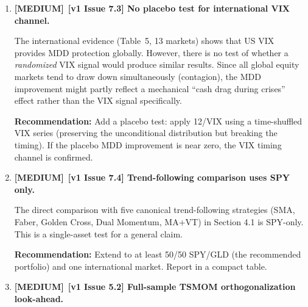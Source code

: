 \documentclass[12pt,a4paper]{article}
\newcommand{\MEDIUM}{\textcolor{medsev}{\textbf{[MEDIUM]}}}
\begin{document}
\begin{enumerate}[label=\textbf{B.\arabic*}]
The paper has 22 assets in Table~1 but the MDD retention decomposition (Table~3 + Table~6 bootstrap) covers only SPY, 50/50, DIA, QQQ, and IWM --- all US large-cap equity (plus a blend). The 90--97\% retention claim is prominently featured in the abstract and conclusion.

\textbf{Severity remains HIGH:} The paper's strongest claim (``90--97\% MDD retention'') rests on 5 assets that are highly correlated (SPY/DIA/QQQ/IWM all have $\rho > 0.85$ with each other). This is essentially 1--2 independent observations. If MDD retention is 70\% for EEM or 50\% for GLD, the narrative changes substantially.

\textbf{Recommendation:} Report MDD retention for all 22 assets (at minimum: one commodity, one bond, one EM equity). If retention varies across asset classes, this is a valuable finding that strengthens the paper (boundary condition), not a weakness.


\item \MEDIUM\ \textbf{[v1 Issue 7.3] No placebo test for international VIX channel.}

The international evidence (Table~5, 13 markets) shows that US VIX provides MDD protection globally. However, there is no test of whether a \textit{randomized} VIX signal would produce similar results. Since all global equity markets tend to draw down simultaneously (contagion), the MDD improvement might partly reflect a mechanical ``cash drag during crises'' effect rather than the VIX signal specifically.

\textbf{Recommendation:} Add a placebo test: apply 12/VIX using a time-shuffled VIX series (preserving the unconditional distribution but breaking the timing). If the placebo MDD improvement is near zero, the VIX timing channel is confirmed.


\item \MEDIUM\ \textbf{[v1 Issue 7.4] Trend-following comparison uses SPY only.}

The direct comparison with five canonical trend-following strategies (SMA, Faber, Golden Cross, Dual Momentum, MA+VT) in Section 4.1 is SPY-only. This is a single-asset test for a general claim.

\textbf{Recommendation:} Extend to at least 50/50 SPY/GLD (the recommended portfolio) and one international market. Report in a compact table.


\item \MEDIUM\ \textbf{[v1 Issue 5.2] Full-sample TSMOM orthogonalization look-ahead.}


\end{enumerate}
\end{document}
